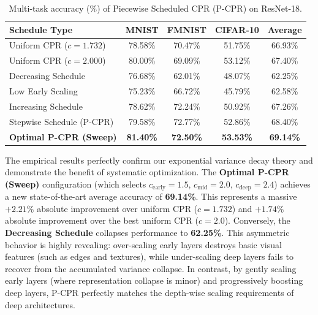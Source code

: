 \documentclass{article}
\theoremstyle{plain}
\theoremstyle{definition}
\theoremstyle{remark}
\begin{document}
\begin{table}[ht]
\caption{Multi-task accuracy (\%) of Piecewise Scheduled CPR (P-CPR) on ResNet-18.}
\label{table:piecewise_results}
\vskip 0.15in
\begin{center}
\begin{small}
\begin{tabular}{lcccc}
\toprule
Schedule Type & MNIST & FMNIST & CIFAR-10 & Average \\
\midrule
Uniform CPR ($c=1.732$) & 78.58\% & 70.47\% & 51.75\% & 66.93\% \\
Uniform CPR ($c=2.000$) & 80.00\% & 69.09\% & 53.12\% & 67.40\% \\
\midrule
Decreasing Schedule & 76.68\% & 62.01\% & 48.07\% & 62.25\% \\
Low Early Scaling & 75.23\% & 66.72\% & 45.79\% & 62.58\% \\
Increasing Schedule & 78.62\% & 72.24\% & 50.92\% & 67.26\% \\
Stepwise Schedule (P-CPR) & 79.58\% & 72.77\% & 52.86\% & 68.40\% \\
\textbf{Optimal P-CPR (Sweep)} & \textbf{81.40\%} & \textbf{72.50\%} & \textbf{53.53\%} & \textbf{69.14\%} \\
\bottomrule
\end{tabular}
\end{small}
\end{center}
\vskip -0.1in
\end{table}

The empirical results perfectly confirm our exponential variance decay theory and demonstrate the benefit of systematic optimization. The \textbf{Optimal P-CPR (Sweep)} configuration (which selects $c_{\text{early}} = 1.5$, $c_{\text{mid}} = 2.0$, $c_{\text{deep}} = 2.4$) achieves a new state-of-the-art average accuracy of \textbf{69.14\%}. This represents a massive $+2.21\%$ absolute improvement over uniform CPR ($c=1.732$) and $+1.74\%$ absolute improvement over the best uniform CPR ($c=2.0$). 
Conversely, the \textbf{Decreasing Schedule} collapses performance to \textbf{62.25\%}. This asymmetric behavior is highly revealing: over-scaling early layers destroys basic visual features (such as edges and textures), while under-scaling deep layers fails to recover from the accumulated variance collapse. In contrast, by gently scaling early layers (where representation collapse is minor) and progressively boosting deep layers, P-CPR perfectly matches the depth-wise scaling requirements of deep architectures.
\end{document}
